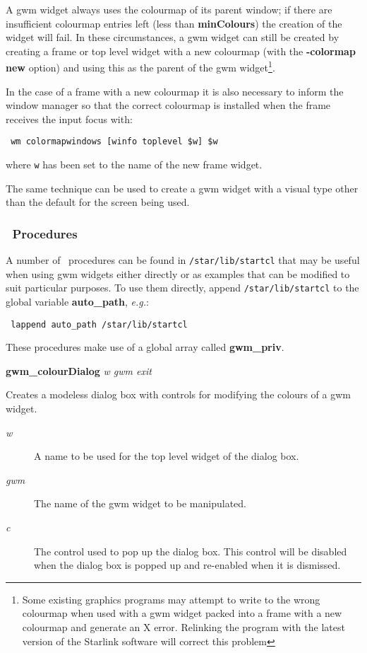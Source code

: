 A gwm widget always uses the colourmap of its parent window; if there
are insufficient colourmap entries left (less than {\bf minColours})
the creation of the widget will fail. In these circumstances, a gwm
widget can still be created by creating a frame or top level widget
with a new colourmap (with the {\bf -colormap new} option) and using
this as the parent of the gwm widget\footnote{Some existing graphics
programs may attempt to write to the wrong colourmap when used with a
gwm widget packed into a frame with a new colourmap and generate an X
error. Relinking the program with the latest version of the Starlink
software will correct this problem}.

In the case of a frame with a new colourmap it is also necessary to inform
the window manager so that the correct colourmap is installed when the
frame receives the input focus with:
\begin{tquote}{\tt
wm colormapwindows [winfo toplevel \$w] \$w
}\end{tquote}
where {\tt w} has been set to the name of the new frame widget.

The same technique can be used to create a gwm widget with a visual type
other than the default for the screen being used.

\subsubsection{\Tk\ Procedures}

A number of \Tk\ procedures can be found in {\tt{/star/lib/startcl}} that may
be useful when using gwm widgets either directly or as examples that can be
modified to suit particular purposes. To use them directly, append 
{\tt /star/lib/startcl} to the global variable {\bf auto\_path}, {\em{e.g.}}:

\begin{tquote}{\tt
lappend auto\_path /star/lib/startcl
}\end{tquote}

These procedures make use of a global array called {\bf gwm\_priv}.

{\bf gwm\_colourDialog} {\em w gwm exit}
\begin{rquote}
Creates a modeless dialog box with controls for modifying the colours of
a gwm widget.

\begin{description}
\item[{\em w}] A name to be used for the top level widget of the dialog box.
\item[{\em gwm}] The name of the gwm widget to be manipulated.
\item[{\em c}] The control used to pop up the dialog box. This control will
be disabled when the dialog box is popped up and re-enabled when it is
dismissed.

\end{description}
\end{rquote}

